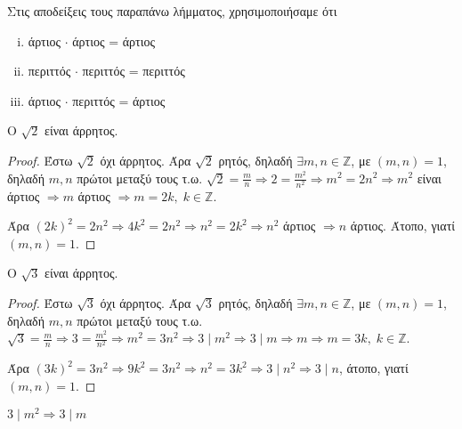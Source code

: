 \begin{rem}
  Στις αποδείξεις τους παραπάνω λήμματος, χρησιμοποιήσαμε ότι 
  \begin{enumerate}[(i)]
    \item άρτιος $ \cdot $ άρτιος = άρτιος
    \item περιττός $ \cdot $ περιττός = περιττός
    \item άρτιος $ \cdot $ περιττός = άρτιος
  \end{enumerate}
\end{rem}

\begin{mybox2}
\begin{thm}
  Ο $ \sqrt{2} $ είναι άρρητος.
\end{thm}
\end{mybox2}

\begin{proof}
  Έστω $ \sqrt{2} $ όχι άρρητος. Άρα $ \sqrt{2} $ ρητός, δηλαδή $ \exists m,n 
  \in \mathbb{Z} $, με $ (m,n)=1 $, δηλαδή $ m,n $ πρώτοι μεταξύ τους
  τ.ω. $ \sqrt{2} = \frac{m}{n} \Rightarrow 2 = \frac{m^{2}}{n^{2}} \Rightarrow 
  m^{2} = 2n^{2} \Rightarrow m^{2}$ είναι άρτιος $ \Rightarrow m $ άρτιος 
  $ \Rightarrow m = 2k, \; k \in \mathbb{Z}$. 

  Άρα $ (2k)^{2} = 2n^{2} \Rightarrow 4k^{2}=2n^{2} \Rightarrow n^{2} = 2k^{2} 
  \Rightarrow n^{2} $ άρτιος $ \Rightarrow n $ άρτιος. Άτοπο, γιατί $ (m,n)=1 $.
\end{proof}

\begin{example}
  Ο $ \sqrt{3} $ είναι άρρητος.
\end{example}

\begin{proof}
  Έστω $ \sqrt{3} $ όχι άρρητος. Άρα $ \sqrt{3} $ ρητός, δηλαδή $ \exists m,n 
  \in \mathbb{Z} $, με $ (m,n)=1 $, δηλαδή $ m,n $ πρώτοι μεταξύ τους
  τ.ω. $ \sqrt{3} = \frac{m}{n} \Rightarrow 3 = \frac{m^{2}}{n^{2}} \Rightarrow 
  m^{2} = 3n^{2} \Rightarrow 3 \mid m^{2} \Rightarrow 3 \mid m  \Rightarrow m 
  \Rightarrow m = 3k, \; k \in \mathbb{Z}$. 

  Άρα $ (3k)^{2} = 3n^{2} \Rightarrow 9k^{2}=3n^{2} \Rightarrow n^{2} = 3k^{2} 
  \Rightarrow 3 \mid n^{2} \Rightarrow  3 \mid n$,  άτοπο, γιατί $ (m,n)=1 $.
\end{proof}

\begin{lem}
  $ 3 \mid m^{2} \Rightarrow 3 \mid m $
\end{lem}

